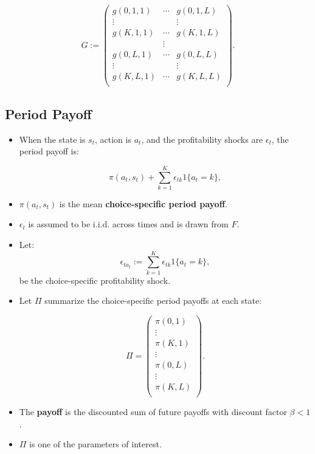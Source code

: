 \documentclass[]{book}
\providecommand{\tightlist}{%
  \setlength{\itemsep}{0pt}\setlength{\parskip}{0pt}}
\begin{document}
\begin{equation}
G := 
\begin{pmatrix}
g(0, 1, 1) & \cdots & g(0, 1, L)\\
\vdots & & \vdots \\
g(K, 1, 1) & \cdots & g(K, 1, L)\\
& \vdots & \\
g(0, L, 1) & \cdots & g(0, L, L)\\
\vdots & & \vdots \\
g(K, L, 1) & \cdots & g(K, L, L)\\
\end{pmatrix}.
\end{equation}

\subsection{Period Payoff}\label{period-payoff}

\begin{itemize}
\tightlist
\item
  When the state is \(s_t\), action is \(a_t\), and the profitability
  shocks are \(\epsilon_t\), the period payoff is:

  \begin{equation}
  \pi(a_t, s_t) + \sum_{k = 1}^K \epsilon_{tk} 1\{a_t = k\},
  \end{equation}
\item
  \(\pi(a_t, s_t)\) is the mean \textbf{choice-specific period payoff}.
\item
  \(\epsilon_t\) is assumed to be i.i.d. across times and is drawn from
  \(F\).
\item
  Let: \[
  \epsilon_{t a_t} := \sum_{k = 1}^K \epsilon_{tk} 1\{a_t = k\},
  \] be the choice-specific profitability shock.
\item
  Let \(\Pi\) summarize the choice-specific period payoffs at each
  state:

  \begin{equation}
  \Pi =
  \begin{pmatrix}
  \pi(0, 1)\\
  \vdots \\
  \pi(K, 1)\\
  \vdots \\
  \pi(0, L)\\
  \vdots \\
  \pi(K, L)\\
  \end{pmatrix}.
  \end{equation}
\item
  The \textbf{payoff} is the discounted sum of future payoffs with
  discount factor \(\beta < 1\).
\item
  \(\Pi\) is one of the parameters of interest.
\end{itemize}
\end{document}
